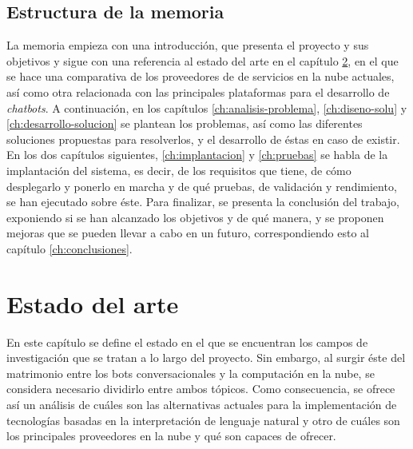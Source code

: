 \documentclass[11pt,spanish,listoffigures]{tfgetsinf}
\begin{document}

\section{Estructura de la memoria}
\label{sec:estructura}

La memoria empieza con una introducción, que presenta el proyecto y sus objetivos y sigue con una referencia al estado del arte en el capítulo \ref{ch:state-of-art}, en el que se hace una comparativa de los proveedores de de servicios en la nube actuales, así como otra relacionada con las principales plataformas para el desarrollo de \textit{chatbots}. A continuación, en los capítulos \ref{ch:analisis-problema}, \ref{ch:diseno-solu} y \ref{ch:desarrollo-solucion} se plantean los problemas, así como las diferentes soluciones propuestas para resolverlos, y el desarrollo de éstas en caso de existir. En los dos capítulos siguientes, \ref{ch:implantacion} y \ref{ch:pruebas} se habla de la implantación del sistema, es decir, de los requisitos que tiene, de cómo desplegarlo y ponerlo en marcha y de qué pruebas, de validación y rendimiento, se han ejecutado sobre éste. Para finalizar, se presenta la conclusión del trabajo, exponiendo si se han alcanzado los objetivos y de qué manera, y se proponen mejoras que se pueden llevar a cabo en un futuro, correspondiendo esto al capítulo \ref{ch:conclusiones}.







\chapter{Estado del arte}
\label{ch:state-of-art}

En este capítulo se define el estado en el que se encuentran los campos de investigación que se tratan a lo largo del proyecto. Sin embargo, al surgir éste del matrimonio entre los bots conversacionales y la computación en la nube, se considera necesario dividirlo entre ambos tópicos. Como consecuencia, se ofrece así un análisis de cuáles son las alternativas actuales para la implementación de tecnologías basadas en la interpretación de lenguaje natural y otro de cuáles son los principales proveedores en la nube y qué son capaces de ofrecer.
\end{document}
